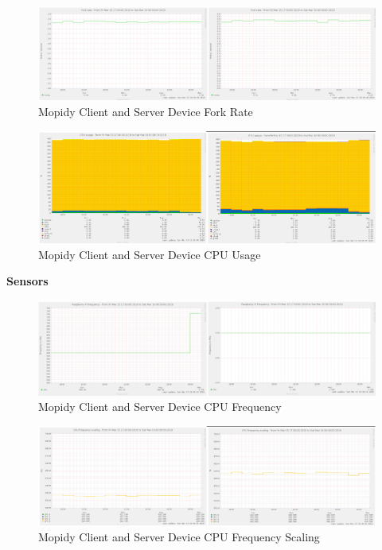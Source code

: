 \documentclass[11pt,a4paper,headinclude=false,footinclude=false]{scrreprt}
\begin{document}
\begin{figure}[H]
\includegraphics{ResultsAndAnalysis/MopidyServerTestImages/013MopidyForkRate.png}
\centering
\caption{Mopidy Client and Server Device Fork Rate}
\label{MopidyForkRate}
\end{figure}

\begin{figure}[H]
\includegraphics{ResultsAndAnalysis/MopidyServerTestImages/004MopidyCPUUsage.png}
\centering
\caption{Mopidy Client and Server Device CPU Usage}
\label{MopidyCPUUsage}
\end{figure}

\textbf{Sensors}

\begin{figure}[H]
\includegraphics{ResultsAndAnalysis/MopidyServerTestImages/001MopidyCPUFreq.png}
\centering
\caption{Mopidy Client and Server Device CPU Frequency}
\label{MopidyCPUFreq}
\end{figure}

\begin{figure}[H]
\includegraphics{ResultsAndAnalysis/MopidyServerTestImages/002MopidyCPUFreqScaling.png}
\centering
\caption{Mopidy Client and Server Device CPU Frequency Scaling}
\label{MopidyCPUFreqScaling}
\end{figure}
\end{document}
